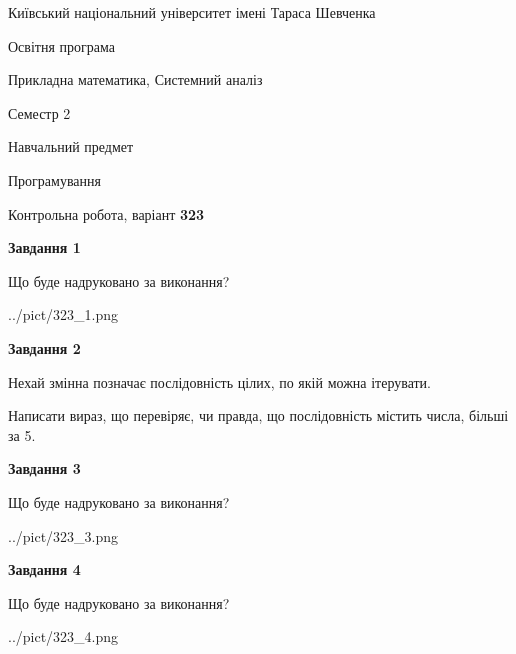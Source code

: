 \documentclass[12pt, ukrainian]{article}
\begin{document}
{{\begin {small}\par
{ \center  Київський національний університет імені Тараса Шевченка \par}
{\parbox {5 cm}{Освітня програма \hfill}{\parbox {8 cm}{Прикладна математика, Системний аналіз \hfill}}\parbox {5 cm}{\hfill Семестр 2}}\par
{\parbox {5 cm} {Навчальний предмет \hfill}\parbox {7 cm}{Програмування \hfill}\parbox {6cm}{\hfill}\par}\vspace{-7pt} \end{small}}{\center Контрольна робота, варіант  \No \textbf
{ 323 }\par}}
{
\begin {large}
{\begin {center}\textbf{Завдання 1}\end {center}}\par
Що буде надруковано за виконання?\par\par
\begin{center}
	{../pict/323_1.png}
\end{center}
\newpage

{\begin {center}\textbf{Завдання 2}\end {center}}\par
Нехай змінна  позначає послідовність цілих, по якій можна ітерувати.

Написати вираз, що перевіряє, чи правда, що послідовність  містить числа, більші за 5.\par
\newpage

{\begin {center}\textbf{Завдання 3}\end {center}}\par
Що буде надруковано за виконання?
\begin{center}
	{../pict/323_3.png}
\end{center}
\newpage

{\begin {center}\textbf{Завдання 4}\end {center}}\par
Що буде надруковано за виконання?\par
\begin{center}
	{../pict/323_4.png}
\end{center}
\newpage


\end{large}}
\end{document}
